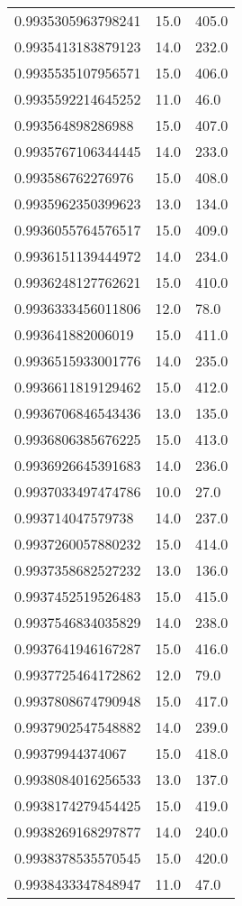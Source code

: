 \begin{center}
\begin{supertabular}[H]{p{0.30\textwidth}p{0.05\textwidth}p{0.05\textwidth}}
0.9935305963798241 & 15.0 & 405.0 \\ 
0.9935413183879123 & 14.0 & 232.0 \\ 
0.9935535107956571 & 15.0 & 406.0 \\ 
0.9935592214645252 & 11.0 & 46.0 \\ 
0.993564898286988 & 15.0 & 407.0 \\ 
0.9935767106344445 & 14.0 & 233.0 \\ 
0.993586762276976 & 15.0 & 408.0 \\ 
0.9935962350399623 & 13.0 & 134.0 \\ 
0.9936055764576517 & 15.0 & 409.0 \\ 
0.9936151139444972 & 14.0 & 234.0 \\ 
0.9936248127762621 & 15.0 & 410.0 \\ 
0.9936333456011806 & 12.0 & 78.0 \\ 
0.993641882006019 & 15.0 & 411.0 \\ 
0.9936515933001776 & 14.0 & 235.0 \\ 
0.9936611819129462 & 15.0 & 412.0 \\ 
0.9936706846543436 & 13.0 & 135.0 \\ 
0.9936806385676225 & 15.0 & 413.0 \\ 
0.9936926645391683 & 14.0 & 236.0 \\ 
0.9937033497474786 & 10.0 & 27.0 \\ 
0.993714047579738 & 14.0 & 237.0 \\ 
0.9937260057880232 & 15.0 & 414.0 \\ 
0.9937358682527232 & 13.0 & 136.0 \\ 
0.9937452519526483 & 15.0 & 415.0 \\ 
0.9937546834035829 & 14.0 & 238.0 \\ 
0.9937641946167287 & 15.0 & 416.0 \\ 
0.9937725464172862 & 12.0 & 79.0 \\ 
0.9937808674790948 & 15.0 & 417.0 \\ 
0.9937902547548882 & 14.0 & 239.0 \\ 
0.99379944374067 & 15.0 & 418.0 \\ 
0.9938084016256533 & 13.0 & 137.0 \\ 
0.9938174279454425 & 15.0 & 419.0 \\ 
0.9938269168297877 & 14.0 & 240.0 \\ 
0.9938378535570545 & 15.0 & 420.0 \\ 
0.9938433347848947 & 11.0 & 47.0 \\ 

\end{supertabular}
\end{center}
